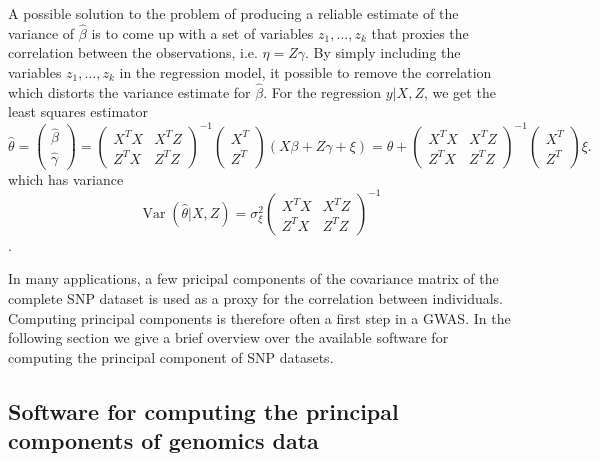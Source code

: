 \documentclass[review]{siamart0516}
\DeclareMathOperator{\Var}{Var}
\begin{document}
A possible solution to the problem of producing a reliable estimate of the variance of $\hat{\beta}$ is to come up with a set of variables $z_1,\dots,z_k$ that proxies the correlation between the observations, i.e. $\eta=Z\gamma$. By simply including the variables $z_1,\dots,z_k$ in the regression model, it possible to remove the correlation which distorts the variance estimate for $\hat{\beta}$. For the regression $y|X,Z$, we get the least squares estimator
\begin{equation*}
    \hat{\theta} = \begin{pmatrix}\hat{\beta} \\ \hat{\gamma}\end{pmatrix} =
    \begin{pmatrix}
        X^TX & X^TZ \\ Z^TX & Z^TZ
    \end{pmatrix}^{-1}
    \begin{pmatrix}
        X^T \\ Z^T
    \end{pmatrix}
    (X\beta + Z\gamma + \xi)=
    \theta +
            \begin{pmatrix}
        X^TX & X^TZ \\ Z^TX & Z^TZ
    \end{pmatrix}^{-1}
    \begin{pmatrix}
        X^T \\ Z^T
    \end{pmatrix}\xi.
\end{equation*}
which has variance
\begin{equation*}
    \Var(\hat{\theta}|X,Z)=\sigma_\xi^2
        \begin{pmatrix} X^TX & X^TZ \\ Z^TX & Z^TZ \end{pmatrix}^{-1}
\end{equation*}.

In many applications, a few pricipal components of the covariance matrix of the complete SNP dataset is used as a proxy for the correlation between individuals. Computing principal components is therefore often a first step in a GWAS. In the following section we give a brief overview over the available software for computing the principal component of SNP datasets.


\subsection{Software for computing the principal components of genomics data}
\end{document}
